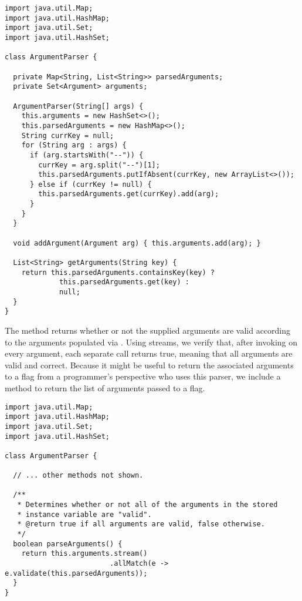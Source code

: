 \begin{lstlisting}[language=MyJava]
import java.util.Map;
import java.util.HashMap;
import java.util.Set;
import java.util.HashSet;

class ArgumentParser {

  private Map<String, List<String>> parsedArguments;
  private Set<Argument> arguments;

  ArgumentParser(String[] args) {
    this.arguments = new HashSet<>();
    this.parsedArguments = new HashMap<>();
    String currKey = null;
    for (String arg : args) {
      if (arg.startsWith("--")) {
        currKey = arg.split("--")[1];
        this.parsedArguments.putIfAbsent(currKey, new ArrayList<>());
      } else if (currKey != null) {
        this.parsedArguments.get(currKey).add(arg);
      }
    }
  }

  void addArgument(Argument arg) { this.arguments.add(arg); }

  List<String> getArguments(String key) {
    return this.parsedArguments.containsKey(key) ? 
             this.parsedArguments.get(key) : 
             null;
  }
}
\end{lstlisting}

The  method returns whether or not the supplied arguments are valid according to the arguments populated via . Using streams, we verify that, after invoking  on every argument, each separate call returns true, meaning that all arguments are valid and correct. Because it might be useful to return the associated arguments to a flag from a programmer's perspective who uses this parser, we include a  method to return the list of arguments passed to a flag.

\begin{lstlisting}[language=MyJava]
import java.util.Map;
import java.util.HashMap;
import java.util.Set;
import java.util.HashSet;

class ArgumentParser {
  
  // ... other methods not shown.

  /**
   * Determines whether or not all of the arguments in the stored
   * instance variable are "valid".
   * @return true if all arguments are valid, false otherwise.
   */
  boolean parseArguments() {
    return this.arguments.stream()
                         .allMatch(e -> e.validate(this.parsedArguments));
  }
}
\end{lstlisting}

